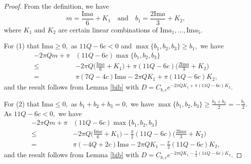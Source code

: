 \documentclass[11pt]{article}
\theoremstyle{remark}
\theoremstyle{remark}
\numberwithin{equation}{section}
\begin{document}
\begin{proof}
From the definition, we have 
$$m=\frac{\mathrm{Im}a}{6}+K_1\quad\text{and}\quad b_1=\frac{2\mathrm{Im}a}{3}+K_2,$$
where $K_1$ and $K_2$ are certain linear combinations of $\mathrm{Im}a_1,\dots,\mathrm{Im}a_5.$

For (1) that $\mathrm{Im}a\geqslant 0,$ as $11Q-6c<0$ and  $\max\{b_1,b_2,b_3\}\geqslant b_1,$ we have
\begin{equation*}
\begin{split}
    -2\pi Qm + \pi &(11Q-6c)\max\{b_1,b_2,b_3\} \\
\leqslant &-2\pi Q\bigg(\frac{\mathrm{Im}a}{6}+K_1\bigg) + \pi (11Q-6c) \bigg(\frac{2\mathrm{Im}a}{3}+K_2\bigg)\\
=& \pi(7Q-4c)\mathrm{Im}a -2\pi Q K_1 +\pi(11Q-6c)K_2,
\end{split}
\end{equation*}
and the result follows from Lemma \ref{bib} with $D=C_{b,c}e^{-2\pi Q K_1 + \pi(11Q-6c)K_2}.$


For (2) that $\mathrm{Im}a\leqslant 0,$ as $b_1+b_2+b_3=0,$ we have $\max\{b_1,b_2,b_3\}\geqslant \frac{b_2+b_3}{2}=-\frac{b_1}{2}.$ As $11Q-6c<0,$ we have
\begin{equation*}
\begin{split}
    -2\pi Qm + \pi &(11Q-6c)\max\{b_1,b_2,b_3\} \\
\leqslant &-2\pi Q\bigg(\frac{\mathrm{Im}a}{6}+K_1\bigg) -\frac{\pi}{2} (11Q-6c) \bigg(\frac{2\mathrm{Im}a}{3}+K_2\bigg)\\
=& \pi(-4Q+2c)\mathrm{Im}a -2\pi Q K_1 - \frac{\pi}{2}(11Q-6c)K_2,
\end{split}
\end{equation*}
and the result follows from Lemma \ref{bib} with $D=C_{b,c}e^{-2\pi QK_1 - \frac{\pi}{2}(11Q-6c)K_2}.$
\end{proof}
\end{document}
